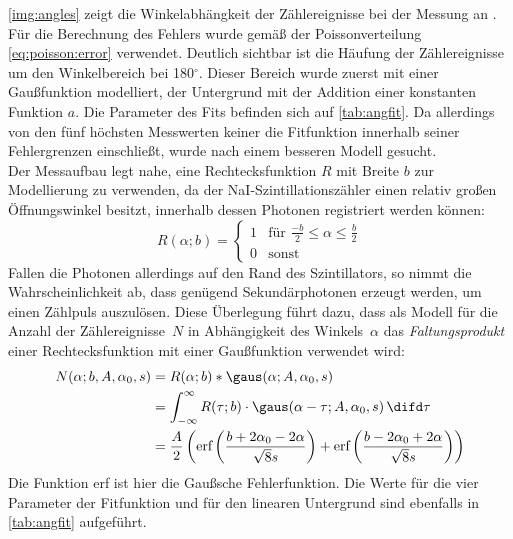 \autoref{img:angles} zeigt die Winkelabhängkeit der Zählereignisse bei der Messung an \na.
Für die Berechnung des Fehlers wurde gemäß der Poissonverteilung \autoref{eq:poisson:error} verwendet.
Deutlich sichtbar ist die Häufung der Zählereignisse um den Winkelbereich bei 180$^\circ$.
Dieser Bereich wurde zuerst mit einer Gaußfunktion modelliert,
der Untergrund mit der Addition einer konstanten Funktion $a$.
Die Parameter des Fits befinden sich auf \autoref{tab:angfit}.
Da allerdings von den fünf höchsten Messwerten keiner die Fitfunktion innerhalb seiner Fehlergrenzen einschließt,
wurde nach einem besseren Modell gesucht.\\
Der Messaufbau legt nahe, eine Rechtecksfunktion $R$ mit Breite $b$ zur Modellierung zu verwenden,
da der NaI-Szintillationszähler einen relativ großen Öffnungswinkel besitzt,
innerhalb dessen Photonen registriert werden können:
\begin{equation}
  R(\alpha;b) =
\begin{cases}
1 & \text{für }\frac{-b}{2} \leq \alpha \leq \frac{b}{2}\\
0 & \text{sonst}
\end{cases}
\end{equation}
Fallen die Photonen allerdings auf den Rand des Szintillators,
so nimmt die Wahrscheinlichkeit ab, dass genügend Sekundärphotonen erzeugt werden,
um einen Zählpuls auszulösen.
Diese Überlegung führt dazu, dass als Modell für die Anzahl der Zählereignisse~$N$
in Abhängigkeit des Winkels~$\alpha$
das \emph{Faltungsprodukt} einer Rechtecksfunktion mit einer
Gaußfunktion verwendet wird:
\begin{equation}
\begin{split}
  N(\alpha;b,A,\alpha_0,s)&=R(\alpha;b)*\gaus(\alpha;A,\alpha_0,s)\\
  & = \int_{-\infty}^{\infty}{R(\tau;b) \cdot  \gaus(\alpha-\tau;A,\alpha_0,s) \, \difd\tau}\\
  & =   \frac{A}{2} \left(\text{erf}\left(\frac{b+2 \alpha_0 -2 \alpha}{\sqrt{8} s }\right)+
  \text{erf}\left(\frac{b-2 \alpha_0 +2 \alpha}{\sqrt{8} s }\right)\right)
\end{split}
\end{equation}
Die Funktion erf ist hier die Gaußsche Fehlerfunktion.
Die Werte für die vier Parameter der Fitfunktion und für den linearen Untergrund sind ebenfalls
in \autoref{tab:angfit} aufgeführt.

